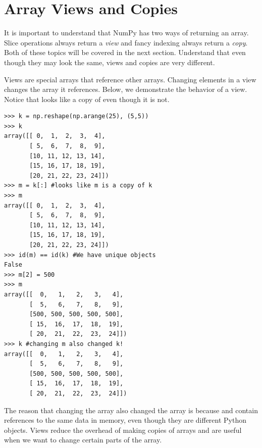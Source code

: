 
\section*{Array Views and Copies}
It is important to understand that NumPy has two ways of returning an array.
Slice operations always return a \emph{view} and fancy indexing always return a \emph{copy}.
Both of these topics will be covered in the next section.
Understand that even though they may look the same, views and copies are very different.

Views are special arrays that reference other arrays.
Changing elements in a view changes the array it references.
Below, we demonstrate the behavior of a view.
Notice that  looks like a copy of  even though it is not.
\begin{lstlisting}
>>> k = np.reshape(np.arange(25), (5,5))
>>> k
array([[ 0,  1,  2,  3,  4],
       [ 5,  6,  7,  8,  9],
       [10, 11, 12, 13, 14],
       [15, 16, 17, 18, 19],
       [20, 21, 22, 23, 24]])
>>> m = k[:] #looks like m is a copy of k
>>> m
array([[ 0,  1,  2,  3,  4],
       [ 5,  6,  7,  8,  9],
       [10, 11, 12, 13, 14],
       [15, 16, 17, 18, 19],
       [20, 21, 22, 23, 24]])
>>> id(m) == id(k) #We have unique objects
False
>>> m[2] = 500
>>> m
array([[  0,   1,   2,   3,   4],
       [  5,   6,   7,   8,   9],
       [500, 500, 500, 500, 500],
       [ 15,  16,  17,  18,  19],
       [ 20,  21,  22,  23,  24]])
>>> k #changing m also changed k!
array([[  0,   1,   2,   3,   4],
       [  5,   6,   7,   8,   9],
       [500, 500, 500, 500, 500],
       [ 15,  16,  17,  18,  19],
       [ 20,  21,  22,  23,  24]])
\end{lstlisting}
The reason that changing the array  also changed the array  is because  
and  contain references to the same data in memory, even though they are different 
Python objects.
Views reduce the overhead of making copies of arrays and are useful when we want to change 
certain parts of the array.

